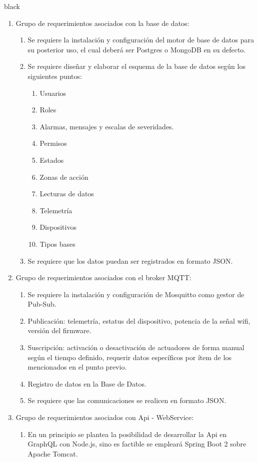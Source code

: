 \documentclass[11pt]{charter}
\begin{document}
\begin{consigna}{black}
\begin{enumerate}
\begin{enumerate}
	\end{enumerate}
\item Grupo de requerimientos asociados con la base de datos:
	\begin{enumerate}
		\item Se requiere la instalación y configuración del motor de base de datos para su posterior uso, el cual deberá ser Postgres o MongoDB en su defecto.
		\item Se requiere diseñar y elaborar el esquema de la base de datos según los siguientes puntos:
			\begin{enumerate}
				\item Usuarios
				\item Roles
				\item Alarmas, mensajes y escalas de severidades.
				\item Permisos
				\item Estados
				\item Zonas de acción
				\item Lecturas de datos
				\item Telemetría
				\item Dispositivos
				\item Tipos bases
			\end{enumerate}
		\item Se requiere que los datos puedan ser registrados en formato JSON.
	\end{enumerate}
\item Grupo de requerimientos asociados con el broker MQTT:
	\begin{enumerate}
		\item Se requiere la instalación y configuración de Mosquitto como gestor de Pub-Sub.
		\item Publicación: telemetría, estatus del dispositivo, potencia de la señal wifi, versión del firmware.
		\item Suscripción: activación o desactivación de actuadores de forma manual según el tiempo definido, requerir datos específicos por ítem de los mencionados en el punto previo.
		\item Registro de datos en la Base de Datos.
		\item Se requiere que las comunicaciones se realicen en formato JSON.
	\end{enumerate}	
\item Grupo de requerimientos asociados con Api - WebService:
	\begin{enumerate}
		\item En un principio se plantea la posibilidad de desarrollar la Api en GraphQL con Node.js, sino es factible se empleará Spring Boot 2 sobre Apache Tomcat.

\end{enumerate}
\end{enumerate}
\end{consigna}
\end{document}
